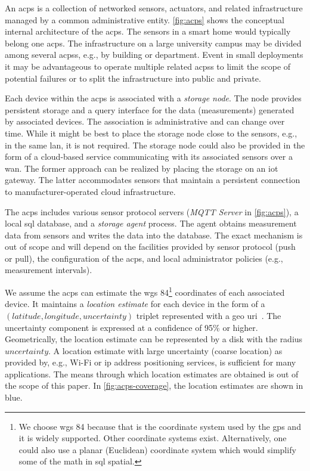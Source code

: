 An \gls{acps} is a collection of networked sensors, actuators, and related infrastructure managed by a common administrative entity. \cref{fig:acps} shows the conceptual internal architecture of the \gls{acps}. The sensors in a smart home would typically belong one \gls{acps}. The infrastructure on a large university campus may be divided among several \glspl{acps}, e.g., by building or department. Event in small deployments it may be advantageous to operate multiple related \glspl{acps} to limit the scope of potential failures or to split the infrastructure into public and private.

Each device within the \gls{acps} is associated with a \emph{storage node}. The node provides persistent storage and a query interface for the data (measurements) generated by associated devices. The association is administrative and can change over time. While it might be best to place the storage node close to the sensors, e.g., in the same \gls{lan}, it is not required. The storage node could also be provided in the form of a cloud-based service communicating with its associated sensors over a \gls{wan}. The former approach can be realized by placing the storage on an \gls{iot} gateway. The latter accommodates sensors that maintain a persistent connection to manufacturer-operated cloud infrastructure.

The \gls{acps} includes various sensor protocol servers (\emph{MQTT Server} in \cref{fig:acps}), a local \gls{sql} database, and a \emph{storage agent} process. The agent obtains measurement data from sensors and writes the data into the database. The exact mechanism is out of scope and will depend on the facilities provided by sensor protocol (push or pull), the configuration of the \gls{acps}, and local administrator policies (e.g., measurement intervals).


We assume the \gls{acps} can estimate the \gls{wgs} 84\footnote{We choose \gls{wgs} 84 because that is the coordinate system used by the \gls{gps} and it is widely supported. Other coordinate systems exist. Alternatively, one could also use a planar (Euclidean) coordinate system which would simplify some of the math in \gls{sql} spatial.} coordinates of each associated device. It maintains a \emph{location estimate} for each device in the form of a $(latitude, longitude, uncertainty)$ triplet represented with a geo \gls{uri}~\cite{rfc5870}. The uncertainty component is expressed at a confidence of 95\% or higher. Geometrically, the location estimate can be represented by a disk with the radius $uncertainty$. A location estimate with large uncertainty (coarse location) as provided by, e.g., Wi-Fi or \gls{ip} address positioning services, is sufficient for many applications. The means through which location estimates are obtained is out of the scope of this paper. In \cref{fig:acps-coverage}, the location estimates are shown in blue.

